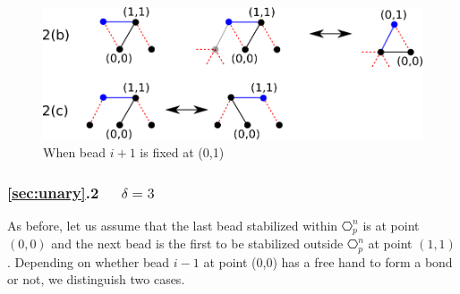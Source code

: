 \begin{figure}
	\centering
	\includegraphics[width=0.8\linewidth]{./Fig/hexagonOut3n}
	
	\caption{When bead $i+1$ is fixed at (0,1)}
	\label{fig:hexagonOut2}
\end{figure}


\subsubsection{\ref{sec:unary}.2 \ \ $\delta = 3$\\}
As before, let us assume that the last bead stabilized within $\hexagon_p^n$ is at point $(0,0)$ and the next bead is the first to be stabilized outside $\hexagon_p^n$ at point $(1,1)$. Depending on whether bead $i-1$ at point (0,0) has a free hand to form a bond or not, we distinguish two cases.
